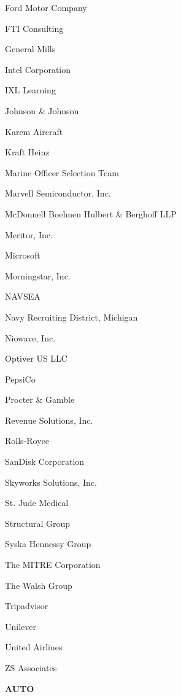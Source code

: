 \documentclass[twoside]{article}
\begin{document}
\begin{center}
\begin{multicols}{5}
\begin{FlushLeft}
\begin{compactitem}
\item Ford Motor Company
\item FTI Consulting
\item General Mills
\item Intel Corporation
\item IXL Learning
\item Johnson \& Johnson
\item Karem Aircraft
\item Kraft Heinz
\item Marine Officer Selection Team
\item Marvell Semiconductor, Inc.
\item McDonnell Boehnen Hulbert \& Berghoff LLP
\item Meritor, Inc.
\item Microsoft
\item Morningstar, Inc.
\item NAVSEA
\item Navy Recruiting District, Michigan
\item Niowave, Inc.
\item Optiver US LLC
\item PepsiCo
\item Procter \& Gamble
\item Revenue Solutions, Inc.
\item Rolls-Royce
\item SanDisk Corporation
\item Skyworks Solutions, Inc.
\item St. Jude Medical
\item Structural Group
\item Syska Hennessy Group
\item The MITRE Corporation
\item The Walsh Group
\item Tripadvisor
\item Unilever
\item United Airlines
\item ZS Associates
\end{compactitem}
        \end{FlushLeft}
        \vspace{1em}
        {\fontsize{14}{16}\selectfont \bf AUTO}\\
        \vspace{-1em}
        ~\hrulefill~
        \vspace{-.9em}
        \begin{FlushLeft}
        \begin{compactitem}

\end{compactitem}
\end{FlushLeft}
\end{multicols}
\end{center}
\end{document}

